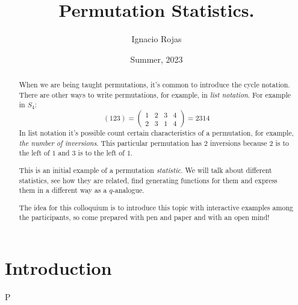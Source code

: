 \documentclass[12pt]{memoir}
\title{\vspace{-2.7cm}Permutation Statistics.\vspace{-0.7cm}}
\author{Ignacio Rojas}
\date{Summer, 2023}
\def\nextra {P}
\begin{document}
\bgroup
\renewcommand\thesection{\arabic{section}}
\renewcommand{\thefigure}{\arabic{figure}}
\maketitle
\vspace*{-2.5em}
\begin{abstract}
    \vspace*{-1.5em}
    When we are being taught permutations, it's common to introduce the cycle notation. There are other ways to write permutations, for example, in \emph{list notation}. For example in $S_4$:
    $$(123)=\begin{pmatrix}
        1&2&3&4\\
        2&3&1&4
    \end{pmatrix}=2314$$
    In list notation it's possible count certain characteristics of a permutation, for example, \emph{the number of inversions}. This particular permutation has $2$ inversions because $2$ is to the left of $1$ and $3$ is to the left of $1$.\par 
    This is an initial example of a permutation \emph{statistic}. We will talk about different statistics, see how they are related, find generating functions for them and express them in a different way as a $q$-analogue.\par 
    The idea for this colloquium is to introduce this topic with interactive examples among the participants, so come prepared with pen and paper and with an open mind!
    \end{abstract}
    
    \section{Introduction}

\ifx\nextra\undefined
\printindex
\else\fi
\nocite{*}

%
\end{document}
